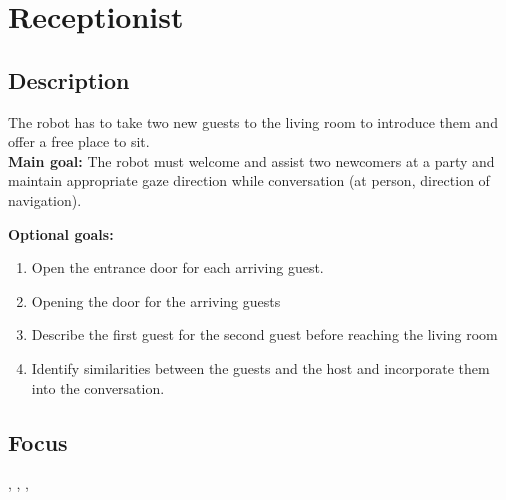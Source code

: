 \section{Receptionist}
\label{test:receptionist}
\subsection*{Description}
The robot has to take two new guests to the living room to introduce them and offer a free place to sit.\\
    
\textbf{Main goal:}
    The robot must welcome and assist two newcomers at a party and maintain appropriate gaze direction while conversation (at person, direction of navigation).

\textbf{Optional goals:}
\begin{enumerate}[nosep]
	\item Open the entrance door for each arriving guest.
	\item Opening the door for the arriving guests
	\item Describe the first guest for the second guest before reaching the living room
	\item Identify similarities between the guests and the host and incorporate them into the conversation.
\end{enumerate}

\subsection*{Focus}
\SysI{}, \HRI{}, \PerDet{}, \PerRec

